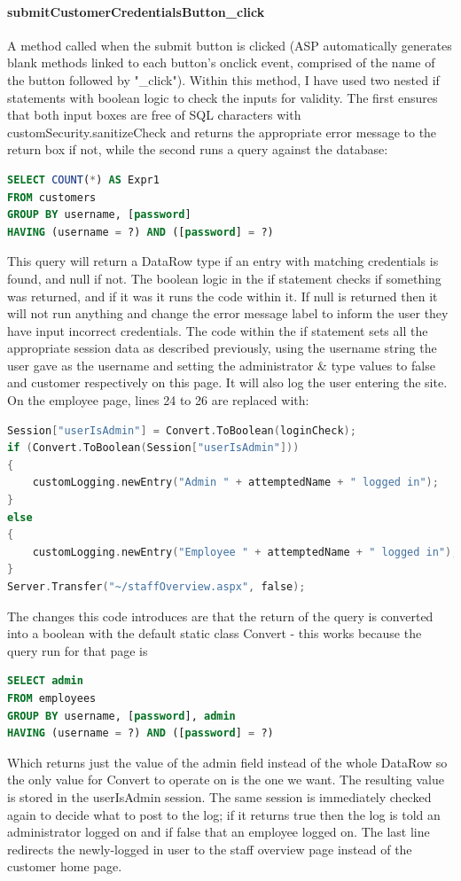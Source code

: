 ﻿\documentclass{article}
\begin{document}
    \paragraph{submitCustomerCredentialsButton\_click}
    A method called when the submit button is clicked (ASP automatically generates blank methods linked to each button's onclick event, comprised of the name of the button followed by "\_click").
    Within this method, I have used two nested if statements with boolean logic to check the inputs for validity.
    The first ensures that both input boxes are free of SQL characters with customSecurity.sanitizeCheck and returns the appropriate error message to the return box if not, while the second runs a query against the database:
    \begin{lstlisting}[language=SQL]
SELECT COUNT(*) AS Expr1
FROM customers
GROUP BY username, [password]
HAVING (username = ?) AND ([password] = ?)
    \end{lstlisting}
    This query will return a DataRow type if an entry with matching credentials is found, and null if not.
    The boolean logic in the if statement checks if something was returned, and if it was it runs the code within it.
    If null is returned then it will not run anything and change the error message label to inform the user they have input incorrect credentials.
    The code within the if statement sets all the appropriate session data as described previously, using the username string the user gave as the username and setting the administrator \& type values to false and customer respectively on this page.
    It will also log the user entering the site.
    On the employee page, lines 24 to 26 are replaced with:
    \begin{lstlisting}[language=C]
Session["userIsAdmin"] = Convert.ToBoolean(loginCheck);
if (Convert.ToBoolean(Session["userIsAdmin"]))
{
    customLogging.newEntry("Admin " + attemptedName + " logged in");
}
else
{
    customLogging.newEntry("Employee " + attemptedName + " logged in");
}
Server.Transfer("~/staffOverview.aspx", false);
    \end{lstlisting}
    The changes this code introduces are that the return of the query is converted into a boolean with the default static class Convert - this works because the query run for that page is
    \begin{lstlisting}[language=SQL]
SELECT admin
FROM employees
GROUP BY username, [password], admin
HAVING (username = ?) AND ([password] = ?)
    \end{lstlisting}
    Which returns just the value of the admin field instead of the whole DataRow so the only value for Convert to operate on is the one we want.
    The resulting value is stored in the userIsAdmin session.
    The same session is immediately checked again to decide what to post to the log; if it returns true then the log is told an administrator logged on and if false that an employee logged on.
    The last line redirects the newly-logged in user to the staff overview page instead of the customer home page.
    \newpage
\end{document}
